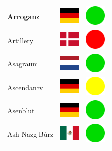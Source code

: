 \documentclass[12pt, a4paper, twoside]{report}
\begin{document}
\begin{center}
\begin{longtable}{|p{5cm}|p{2cm}|p{2cm}|}
 Arroganz                                                   & \includegraphics[width=1cm]{../4x3/de} &   \includegraphics[width=1cm]{../likes/y} \\ \hline
 Artillery                                                  & \includegraphics[width=1cm]{../4x3/dk} &   \includegraphics[width=1cm]{../likes/n} \\ \hline
 Asagraum                                                   & \includegraphics[width=1cm]{../4x3/nl} &   \includegraphics[width=1cm]{../likes/y} \\ \hline
 Ascendancy                                                 & \includegraphics[width=1cm]{../4x3/de} &   \includegraphics[width=1cm]{../likes/m} \\ \hline
 Asenblut                                                   & \includegraphics[width=1cm]{../4x3/de} &   \includegraphics[width=1cm]{../likes/y} \\ \hline
 Ash Nazg Búrz                                              & \includegraphics[width=1cm]{../4x3/mx} &   \includegraphics[width=1cm]{../likes/y} \\ \hline

\end{longtable}
\end{center}
\end{document}
